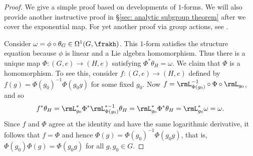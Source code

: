\begin{proof}
    We give a simple proof based on developments of $1$-forms. We will also provide another instructive proof in \S\ref{sec: analytic subgroup theorem} after we cover the exponential map. For yet another proof via group actions, see \cite[Thm.~20.19]{Lee}.

    Consider $\omega=\phi\circ \theta_G\in \Omega^1(G,\frakh)$. This $1$-form satisfies the structure equation because $\phi$ is linear and a Lie algebra homomorphism. Thus there is a unique map $\Phi:(G,e)\to (H,e)$ satisfying $\Phi^\ast \theta_H=\omega$. We claim that $\Phi$ is a homomorphism. To see this, consider $f:(G,e)\to (H,e)$ defined by $f(g)=\Phi(g_0)^{-1}\Phi(g_0g)$ for some fixed $g_0$. Now $f=\rmL_{\Phi(g_0)}^{-1}\circ\Phi\circ \rmL_{g_0}$, and so
    \[f^\ast\theta_H=\rmL_{g_0}^\ast \Phi^\ast \rmL_{\Phi(g_0)}^{\ast-1}\theta_H=\rmL_{g_0}^\ast \Phi^\ast\theta_H=\rmL_{g_0}^\ast \omega=\omega.\]
    Since $f$ and $\Phi$ agree at the identity and have the same logarithmic derivative, it follows that $f=\Phi$ and hence $\Phi(g)=\Phi(g_0)^{-1}\Phi(g_0g)$, that is, $\Phi(g_0)\Phi(g)=\Phi(g_0g)$ for all $g,g_0\in G$.


\end{proof}
